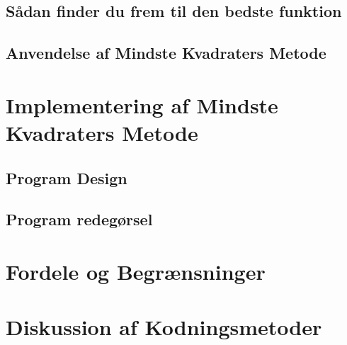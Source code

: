 \subsection{Sådan finder du frem til den bedste funktion}


\subsection{Anvendelse af Mindste Kvadraters Metode}


\section{Implementering af Mindste Kvadraters Metode}


\subsection{Program Design}

\subsection{Program redegørsel}

\section{Fordele og Begrænsninger}

\section{Diskussion af Kodningsmetoder}
